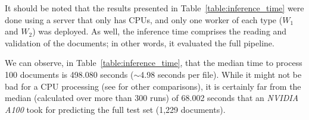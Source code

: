 \documentclass[11pt]{article}
\begin{document}
    It should be noted that the results presented in Table~\ref{table:inference_time} were done using a server that only has CPUs, and only one worker of each type ($W_1$ and $W_2$) was deployed. As well, the inference time comprises the reading and validation of the documents; in other words, it evaluated the full pipeline.

    We can observe, in Table~\ref{table:inference_time}, that the median time to process 100 documents is 498.080 seconds ($\sim$4.98 seconds per file). While it might not be bad for a CPU processing (see \citealp{park_efficient_2022} for other comparisons), it is certainly far from the median (calculated over more than 300 runs) of 68.002 seconds that an \textit{NVIDIA A100} took for predicting the full test set (1,229 documents).%


    
    
    
    
    
\end{document}
